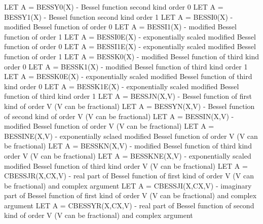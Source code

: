 {       LET A = BESSY0(X)           - Bessel function second kind order 0
       LET A = BESSY1(X)           - Bessel function second kind order 1
       LET A = BESSI0(X)           - modified Bessel function of order 0
       LET A = BESSI1(X)           - modified Bessel function of order 1
       LET A = BESSI0E(X)          - exponentially scaled modified Bessel
                                     function of order 0
       LET A = BESSI1E(X)          - exponentially scaled modified Bessel
                                     function of order 1
       LET A = BESSK0(X)           - modified Bessel function of third
                                     kind order 0
       LET A = BESSK1(X)           - modified Bessel function of third
                                     kind order 1
       LET A = BESSK0E(X)          - exponentially scaled modified Bessel
                                     function of third kind order 0
       LET A = BESSK1E(X)          - exponentially scaled modified Bessel
                                     function of third kind order 1
       LET A = BESSJN(X,V)         - Bessel function of first kind of
                                     order V (V can be fractional)
       LET A = BESSYN(X,V)         - Bessel function of second kind of
                                     order V (V can be fractional)
       LET A = BESSIN(X,V)         - modified Bessel function of order V
                                     (V can be fractional)
       LET A = BESSINE(X,V)        - exponentially sclaed modified Bessel
                                     function of order V (V can be
                                     fractional)
       LET A = BESSKN(X,V)         - modified Bessel function of third
                                     kind order V (V can be fractional)
       LET A = BESSKNE(X,V)        - exponentially scaled modified Bessel
                                     function of third kind order V (V
                                     can be fractional)
       LET A = CBESSJR(X,CX,V)     - real part of Bessel function of
                                     first kind of order V (V can be
                                     fractional) and complex argument
       LET A = CBESSJI(X,CX,V)     - imaginary part of Bessel function
                                     of first kind of order V (V can be
                                     fractional) and complex argument
       LET A = CBESSYR(X,CX,V)     - real part of Bessel function of
                                     second kind of order V (V can be
                                     fractional) and complex argument
}
